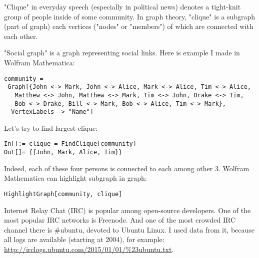 
\leveldown{}

\renewcommand{\CURPATH}{graph/clique}

"Clique" in everyday speech (especially in political news) denotes a tight-knit group of people inside of some community.
In graph theory, "clique" is a subgraph (part of graph) each vertices ("nodes" or "members") of which are connected with each other.


"Social graph" is a graph representing social links.
Here is example I made in Wolfram Mathematica:

\begin{lstlisting}
community = 
 Graph[{John <-> Mark, John <-> Alice, Mark <-> Alice, Tim <-> Alice, 
   Matthew <-> John, Matthew <-> Mark, Tim <-> John, Drake <-> Tim, 
   Bob <-> Drake, Bill <-> Mark, Bob <-> Alice, Tim <-> Mark}, 
  VertexLabels -> "Name"]
\end{lstlisting}

\begin{figure}[H]
\centering
{}
\end{figure}

Let's try to find largest clique:

\begin{lstlisting}
In[]:= clique = FindClique[community]
Out[]= {{John, Mark, Alice, Tim}}
\end{lstlisting}

Indeed, each of these four persons is connected to each among other 3.
Wolfram Mathematica can highlight subgraph in graph:

\begin{lstlisting}
HighlightGraph[community, clique]
\end{lstlisting}

\begin{figure}[H]
\centering
{}
\end{figure}


Internet Relay Chat (IRC) is popular among open-source developers.
One of the most popular IRC networks is Freenode.
And one of the most crowded IRC channel there is \#ubuntu, devoted to Ubuntu Linux.
I used data from it, because all logs are available (starting at 2004), for example:
\url{http://irclogs.ubuntu.com/2015/01/01/%23ubuntu.txt}.

